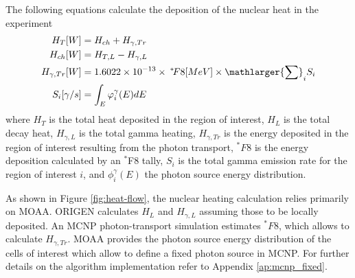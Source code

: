 
The following equations calculate the deposition of the nuclear heat in the experiment
\begin{align}
H_{T} [W] &= H_{ch} + H_{\gamma, Tr}  \label{eq-heat} \\
H_{ch} [W] &= H_{T, L} - H_{\gamma, L} \\
H_{\gamma, Tr} [W] &= 1.6022 \times 10^{-13} \times \: ^* \! F8 [MeV] \times \mathlarger{\sum}_i S_i \\
S_i[\gamma/s] &= \int_{E} \varphi^\gamma_i(E) dE
\end{align}
where $H_{T}$ is the total heat deposited in the region of interest, $H_L$ is the total decay heat, $H_{\gamma, L}$ is the total gamma heating, $H_{\gamma, Tr}$ is the energy deposited in the region of interest resulting from the photon transport, $^\ast F8$ is the energy deposition calculated by an $^\ast$F8 tally, $S_i$ is the total gamma emission rate for the region of interest $i$, and $\phi^\gamma_i(E)$ the photon source energy distribution.

As shown in Figure \ref{fig:heat-flow}, the nuclear heating calculation relies primarily on \gls*{MOAA}.
ORIGEN calculates $H_L$ and $H_{\gamma, L}$ assuming those to be locally deposited.
An MCNP photon-transport simulation estimates $^\ast F8$, which allows to calculate $H_{\gamma, Tr}$.
MOAA provides the photon source energy distribution of the cells of interest which allow to define a fixed photon source in MCNP.
For further details on the algorithm implementation refer to Appendix \ref{ap:mcnp_fixed}.


